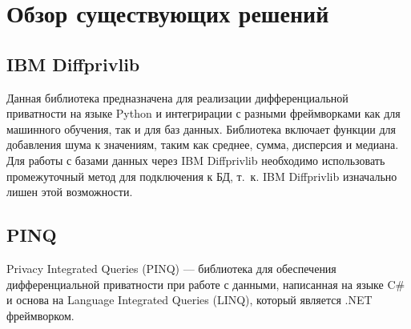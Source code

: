 \chapter{Обзор существующих решений}



\section{IBM Diffprivlib}
Данная библиотека предназначена для реализации дифференциальной приватности на языке Python и интегрирации с разными фреймворками как для машинного обучения, так и для баз данных.
Библиотека включает функции для добавления шума к значениям, таким как среднее, сумма, дисперсия и медиана.~\cite{diffprivlibibmdifferentialprivacy}
Для работы с базами данных через IBM Diffprivlib необходимо использовать промежуточный метод для подключения к БД, т.~к. IBM Diffprivlib изначально лишен этой возможности.

\section{PINQ}
Privacy Integrated Queries (PINQ) --- библиотека для обеспечения дифференциальной приватности при работе с данными, написанная на языке C\# и основа на Language Integrated Queries (LINQ), который является .NET фреймворком.~\cite{Lee2008}

